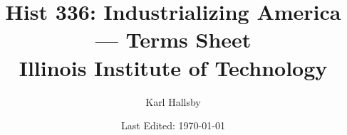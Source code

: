 


% 
% 


\let\emph\relax
\DeclareTextFontCommand{\emph}{\large\em}

\begin{titlepage}
  \title{Hist 336: Industrializing America --- Terms Sheet \\ Illinois Institute of Technology}
  \author{Karl Hallsby}
  \date{Last Edited: \today} %
\end{titlepage}


\maketitle
{} %

